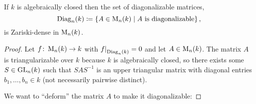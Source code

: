 \begin{proposition}
  \label{proposition: diagonalizable matrices are dense for algebraically closed}
  If $k$ is algebraically closed then the set of diagonalizable matrices,
  \[
              \operatorname{Diag}_n(k)
    \coloneqq  \{
                A \in \operatorname{M}_n(k)
              \mid
                \text{$A$ is diagonalizable}
              \} \,,
  \]
  is Zariski-dense in $\operatorname{M}_n(k)$.
\end{proposition}


\begin{proof}
  Let $f \colon \operatorname{M}_n(k) \to k$ with $\restrict{f}{\Diag_n(k)} = 0$ and let $A \in \operatorname{M}_n(k)$.
  The matrix $A$ is triangularizable over $k$ because $k$ is algebraically closed, so there exists some $S \in \operatorname{GL}_n(k)$ such that $S A S^{-1}$ is an upper triangular matrix with diagonal entries $b_1, \dotsc, b_n \in k$ (not necessarily pairwise distinct).
  
  We want to \enquote{deform} the matrix $A$ to make it diagonalizable:
  

\end{proof}
